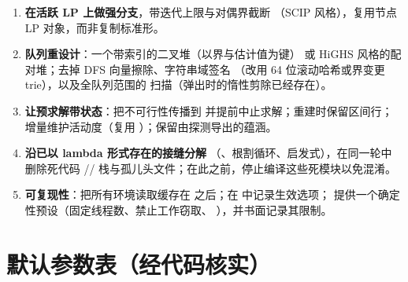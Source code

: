 \documentclass[11pt]{ctexart}
\begin{document}
\begin{enumerate}[nosep]
  行主序矩阵副本；跨族、跨轮共享同一个行主序工作区；通过增量式
   风格的路径插入割，而非三元组重建。
\item \textbf{在活跃 LP 上做强分支}，带迭代上限与对偶界截断
  （SCIP 风格），复用节点 LP 对象，而非复制标准形。
\item \textbf{队列重设计}：一个带索引的二叉堆（以界与估计值为键）
  或 HiGHS 风格的配对堆；去掉 DFS 向量擦除、字符串域签名
  （改用 64 位滚动哈希或界变更 trie），以及全队列范围的
   扫描（弹出时的惰性剪除已经存在）。
\item \textbf{让预求解带状态}：把不可行性传播到
   并提前中止求解；重建时保留区间行；
  增量维护活动度（复用 ）；保留由探测导出的蕴涵。
\item \textbf{沿已以 lambda 形式存在的接缝分解 }
  （、根割循环、启发式），在同一轮中
  删除死代码 //
  栈与孤儿头文件；在此之前，停止编译这些死模块以免混淆。
\item \textbf{可复现性}：把所有环境读取缓存在
   之后；在  中记录生效选项；
  提供一个确定性预设（固定线程数、禁止工作窃取、
  ），并书面记录其限制。
\end{enumerate}

\appendix
\section{默认参数表（经代码核实）}
\label{app:params}
\end{document}
